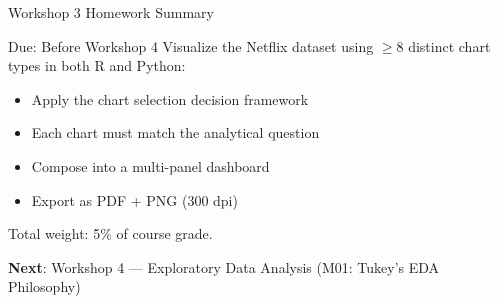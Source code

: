 \documentclass[10pt]{beamer}
\begin{document}
\begin{frame}{Workshop 3 Homework Summary}
  \begin{alertblock}{Due: Before Workshop 4}
    Visualize the Netflix dataset using $\geq$8 distinct chart types
    in both R and Python:
    \begin{itemize}
      \item Apply the chart selection decision framework
      \item Each chart must match the analytical question
      \item Compose into a multi-panel dashboard
      \item Export as PDF + PNG (300 dpi)
    \end{itemize}
    Total weight: 5\% of course grade.
  \end{alertblock}
  \vspace{6pt}
  \textbf{Next}: Workshop 4 --- Exploratory Data Analysis
  (M01: Tukey's EDA Philosophy)
\end{frame}
\end{document}
